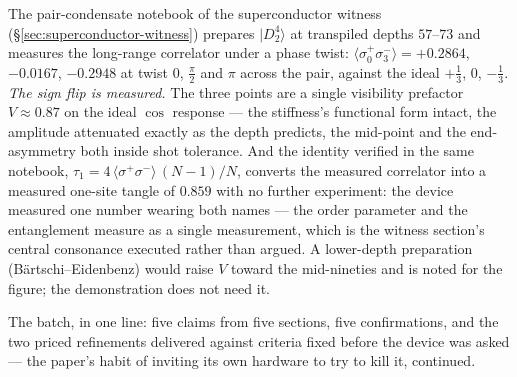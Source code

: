 The pair-condensate notebook of the superconductor witness (\S\ref{sec:superconductor-witness})
prepares $\lvert D^{4}_{2} \rangle$ at transpiled depths $57$--$73$ and measures the long-range
correlator under a phase twist: $\langle \sigma^{+}_{0}\sigma^{-}_{3} \rangle = +0.2864$,
$-0.0167$, $-0.2948$ at twist $0$, $\tfrac{\pi}{2}$ and $\pi$ across the pair, against the ideal
$+\tfrac13$, $0$, $-\tfrac13$. \emph{The sign flip is measured.} The three points are a single
visibility prefactor $V \approx 0.87$ on the ideal $\cos$ response --- the stiffness's functional
form intact, the amplitude attenuated exactly as the depth predicts, the mid-point and the
end-asymmetry both inside shot tolerance. And the identity verified in the same notebook,
$\tau_{1} = 4\,\langle \sigma^{+}\sigma^{-} \rangle\,(N-1)/N$, converts the measured correlator
into a measured one-site tangle of $0.859$ with no further experiment: the device measured one
number wearing both names --- the order parameter and the entanglement measure as a single
measurement, which is the witness section's central consonance executed rather than argued. A
lower-depth preparation (B\"artschi--Eidenbenz) would raise $V$ toward the mid-nineties and is
noted for the figure; the demonstration does not need it.

The batch, in one line: five claims from five sections, five confirmations, and the two priced
refinements delivered against criteria fixed before the device was asked --- the paper's habit of
inviting its own hardware to try to kill it, continued.
